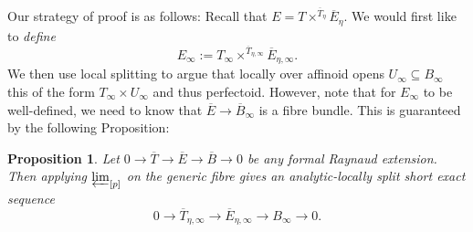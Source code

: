\documentclass[10pt,oneside]{amsart}
\newtheorem{proposition}[theorem]{Proposition}
\theoremstyle{definition}
\begin{document}
	Our strategy of proof is as follows: Recall that $E=T\times^{\overline{T}_{\eta}}\overline{E}_\eta$. We would first like to \textit{define} 
	\[E_{\infty}:=T_{\infty}\times^{\overline{T}_{\eta,\infty}}\overline{E}_{\eta,\infty}.\]
	We then use local splitting to argue that locally over affinoid opens $U_\infty\subseteq B_\infty$ this of the form $T_\infty\times U_\infty$ and thus perfectoid. However, note that for $E_\infty$ to be well-defined, we need to know that $\overline{E}\to \overline{B}_{\infty}$ is a fibre bundle. This is guaranteed by the following  Proposition:
	\begin{proposition}\label{p:local-splitting-of-limit-of-formal-Raynaud-extension}
		Let $0\to \overline{T}\to \overline{E}\to \overline{B}\to 0$ be any formal Raynaud extension. Then applying $\varprojlim_{[p]}$ on the generic fibre gives an analytic-locally split short exact sequence
		\[0\to \overline{T}_{\eta,\infty}\to \overline{E}_{\eta,\infty}\to B_\infty\to 0.\]
	\end{proposition}
\end{document}
